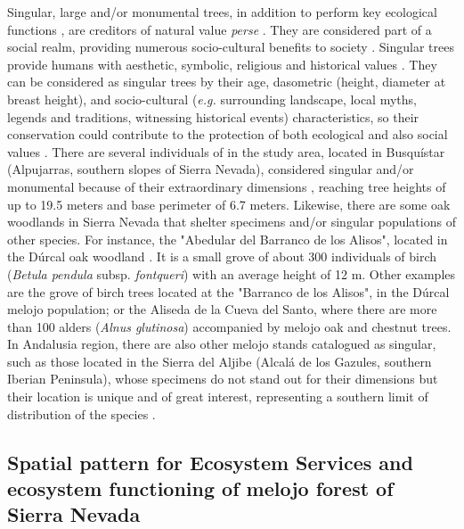 Singular, large and/or monumental trees, in addition to perform key ecological functions \autocites[\emph{e.g.} nutrient cycling; support complex assemblages of species,][]{LindenmayerLaurance2017EcologyDistribution}, are creditors of natural value \emph{perse} \autocites{Asciutoetal2016MonumentalTrees}. They are considered part of a social realm, providing numerous socio-cultural benefits to society \autocites{BlicharskaMikusinski2014IncorporatingSocial,MoyaMoya2013MonumentalTrees}. Singular trees provide humans with aesthetic, symbolic, religious and historical values \autocites{BlicharskaMikusinski2014IncorporatingSocial}. They can be considered as singular trees by their age, dasometric (height, diameter at breast height), and socio-cultural (\emph{e.g.} surrounding landscape, local myths, legends and traditions, witnessing historical events) characteristics, so their conservation could contribute to the protection of both ecological and also social values \autocites{BlicharskaMikusinski2014IncorporatingSocial}. There are several individuals of \Qp in the study area, located in Busquístar (Alpujarras, southern slopes of Sierra Nevada), considered singular and/or monumental because of their extraordinary dimensions \autocite{IruritaFernandezetal2003ArbolesArboledas}, reaching tree heights of up to 19.5 meters and base perimeter of 6.7 meters. Likewise, there are some oak woodlands in Sierra Nevada that shelter specimens and/or singular populations of other species. For instance, the "Abedular del Barranco de los Alisos", located in the Dúrcal oak woodland \autocites{MartinezLabargaetal1990AbedularRelictico}. It is a small grove of about 300 individuals of birch (\emph{Betula pendula} subsp. \emph{fontqueri}) with an average height of 12 m. Other examples are the grove of birch trees located at the "Barranco de los Alisos", in the Dúrcal melojo population; or the Aliseda de la Cueva del Santo, where there are more than 100 alders (\emph{Alnus glutinosa}) accompanied by melojo oak and chestnut trees. In Andalusia region, there are also other melojo stands catalogued as singular, such as those located in the Sierra del Aljibe (Alcalá de los Gazules, southern Iberian Peninsula), whose specimens do not stand out for their dimensions but their location is unique and of great interest, representing a southern limit of distribution of the species \autocite{SanchezGarciaetal2003ArbolesArboledas}. 


\subsection{Spatial pattern for Ecosystem Services and ecosystem functioning of melojo forest of Sierra Nevada}\label{sec:es:spatial} 

